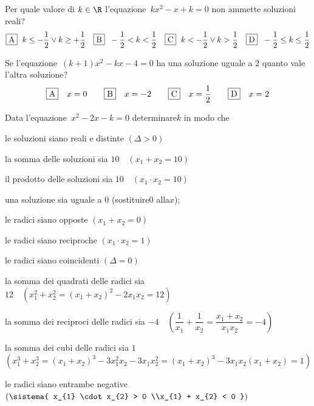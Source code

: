 \begin{esercizio}
\label{ese:3.105}
Per quale valore di \(k \in \R\) l'equazione~\(kx^{2}-x + k = 0\) non 
ammette soluzioni reali?
\[\fbox{A}\;~ k \leq-\dfrac{1}{2} \vee k \geq + \dfrac{1}{2}\quad\fbox{B}\;~ 
- 
\dfrac{1}{2} 
< k < \dfrac{1}{2}\quad\fbox{C}\;~ k <-\dfrac{1}{2} \vee k > 
\dfrac{1}{2}\quad\fbox{D}\;~ - 
\dfrac{1}{2} \leq k \leq \dfrac{1}{2}\]
\end{esercizio}

\begin{esercizio}
\label{ese:3.111}
Se l'equazione~\((k + 1) x^{2}-kx-4 = 0\) ha una soluzione uguale a \(2\) 
quanto 
vale l'altra soluzione?
\[\fbox{A}\quad x = 0\qquad\fbox{B}\quad x =-2\qquad\fbox{C}\quad x = 
\dfrac{1}{2}\qquad\fbox{D}\quad x = 2\]
\end{esercizio}

\begin{esercizio}[*]
\label{ese:3.97}
Data l'equazione~\(x^{2}-2 x-k = 0\) determinare\(k\) in modo che
\begin{enumeratea}
\item le soluzioni siano reali e distinte \quad\((\Delta>0)\)
\item la somma delle soluzioni sia \(10 \quad (x_{1} + x_{2} = 10)\)
\item il prodotto delle soluzioni sia \(10 \quad (x_{1} \cdot x_{2} = 10)\)
\item una soluzione sia uguale a \(0\) \quad (sostituire\(0\) alla\(x\));~
\item le radici siano opposte \quad \((x_{1} + x_{2} = 0)\)
\item le radici siano reciproche \quad \((x_{1} \cdot x_{2} = 1)\)
\item le radici siano coincidenti \quad \((\Delta=0)\)
\item la somma dei quadrati delle radici sia \(12 \quad \left(x_{1}^{2} + 
x_{2}^{2} = (x_{1} + x_{2})^{2}-2x_{1} x_{2} = 12\right)\)
\item la somma dei reciproci delle radici sia \(-4 \quad 
\left(\dfrac{1}{x_{1}} + 
\dfrac{1}{x_{2}} = \dfrac{x_{1} +x_{2}}{x_{1} x_{2}} =-4 \right)\)
\item la somma dei cubi delle radici sia \(1\) \protect\\ \(\left( 
x_{1}^{3} + 
x_{2}^{3} = (x_{1} + x_{2})^{3}-3x_{1}^{2} x_{2}-3x_{1} x_{2}^{2} = (x_{1} 
+ 
x_{2})^{3}-3x_{1} x_{2} (x_{1} + x_{2}) = 1\right)\)
\item le radici siano entrambe negative \(\left(\sistema{ 
x_{1} 
\cdot x_{2} > 0 \\x_{1} + x_{2} < 0 }\right)\)
\end{enumeratea}
\end{esercizio}

